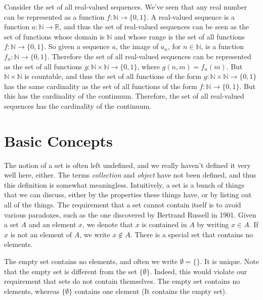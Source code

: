 \documentclass[crop=false,class=book,oneside]{standalone}
\begin{document}
            \begin{lexample}
                Consider the set of all real-valued sequences. We've seen
                that any real number can be represented as a function
                $f:\mathbb{N}\rightarrow\{0,1\}$. A real-valued sequence
                is a function $a:\mathbb{N}\rightarrow\mathbb{R}$, and
                thus the set of real-valued sequences can be seen as the
                set of functions whose domain is $\mathbb{N}$ and whose
                range is the set of all functions
                $f:\mathbb{N}\rightarrow\{0,1\}$. So given a sequence
                $a$, the image of $a_{n}$, for $n\in\mathbb{N}$, is a
                function $f_{n}:\mathbb{N}\rightarrow\{0,1\}$. Therefore
                the set of all real-valued sequences can be represented
                as the set of all functions
                $g:\mathbb{N}\times\mathbb{N}\rightarrow\{0,1\}$, where
                $g(n,m)=f_{n}(m)$. But $\mathbb{N}\times\mathbb{N}$ is
                countable, and thus the set of all functions of the form
                $g:\mathbb{N}\times\mathbb{N}\rightarrow\{0,1\}$ has the
                same cardinality as the set of all functions of the form
                $f:\mathbb{N}\rightarrow\{0,1\}$. But this has the
                cardinality of the continuum. Therefore, the set of all
                real-valued sequences has the cardinality of the continuum.
            \end{lexample}
    \section{Basic Concepts}
        The notion of a \textrm{set} is often left undefined,
        and we really haven't defined it very well here, either.
        The terms \textit{collection} and \textit{object} have
        not been defined, and thus this definition is somewhat
        meaningless. Intuitively, a set is a bunch of things that
        we can discuss, either by the properties these things have,
        or by listing out all of the things. The requirement that
        a set cannot contain itself is to avoid various
        paradoxes, such as the one discovered by Bertrand Russell
        in 1901. Given a set $A$ and an element $x$, we denote that
        $x$ is contained in $A$ by writing $x\in{A}$. If $x$ is
        not an element of $A$, we write $x\notin{A}$. There is a
        special set that contains no elements.
        \par\hfill\par
        The empty set contains no elements, and often we
        write $\emptyset=\{\}$. It is unique. Note that
        the empty set is different from the set $\{\emptyset\}$.
        Indeed, this would violate our requirement that sets do
        not contain themselves. The empty set contains no elements,
        whereas $\{\emptyset\}$ contains one element
        (It contains the empty set).
\end{document}
